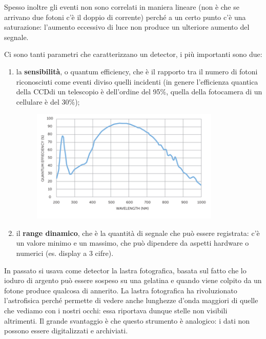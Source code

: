 Spesso inoltre gli eventi non sono correlati in maniera lineare (non è che se arrivano due fotoni c'è il doppio di corrente) perché a un certo punto c'è una saturazione: l'aumento eccessivo di luce non produce un ulteriore aumento del segnale.

Ci sono tanti parametri che caratterizzano un detector, i più importanti sono due:

\begin{enumerate}
   \item la \textbf{sensibilità}, o quantum efficiency, che è il rapporto tra il numero di fotoni riconosciuti come eventi diviso quelli incidenti (in genere l'efficienza quantica della CCD\footnotemark di un telescopio è dell'ordine del 95\%, quella della fotocamera di un cellulare è del 30\%);
   \begin{figure}[H]
      \centering
      \includegraphics[width=9cm]{astro1.png}
   \end{figure}
   \item il \textbf{range dinamico}, che è la quantità di segnale che può essere registrata: c'è un valore minimo e un massimo, che può dipendere da aspetti hardware o numerici (es. display a 3 cifre).
\end{enumerate}


\vspace{0.3cm}

In passato si usava come detector la lastra fotografica, basata sul fatto che lo ioduro di argento può essere sospeso su una gelatina e quando viene colpito da un fotone produce qualcosa di annerito. La lastra fotografica ha rivoluzionato l'astrofisica perché permette di vedere anche lunghezze d'onda maggiori di quelle che vediamo con i nostri occhi: essa riportava dunque stelle non visibili altrimenti. Il grande svantaggio è che questo strumento è analogico: i dati non possono essere digitalizzati e archiviati.

